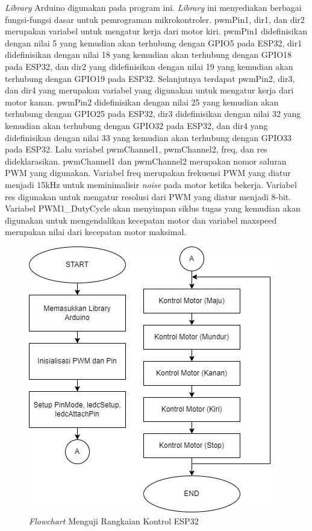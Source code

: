 \emph{Library} Arduino digunakan pada program ini. \emph{Library} ini menyediakan berbagai fungsi-fungsi dasar untuk pemrograman mikrokontroler. pwmPin1, dir1, dan dir2 merupakan variabel untuk mengatur kerja dari motor kiri. pwmPin1 didefinisikan dengan nilai 5 yang kemudian akan terhubung dengan GPIO5 pada ESP32, dir1 didefinisikan dengan nilai 18 yang kemudian akan terhubung dengan GPIO18 pada ESP32, dan dir2 yang didefinisikan dengan nilai 19 yang kemudian akan terhubung dengan GPIO19 pada ESP32. Selanjutnya terdapat pwmPin2, dir3, dan dir4 yang merupakan variabel yang digunakan untuk mengatur kerja dari motor kanan. pwmPin2 didefinisikan dengan nilai 25 yang kemudian akan terhubung dengan GPIO25 pada ESP32, dir3 didefinisikan dengan nilai 32 yang kemudian akan terhubung dengan GPIO32 pada ESP32, dan dir4 yang didefinisikan dengan nilai 33 yang kemudian akan terhubung dengan GPIO33 pada ESP32. Lalu variabel pwmChannel1, pwmChannel2, freq, dan res dideklarasikan. pwmChannel1 dan pwmChannel2 merupakan nomor saluran PWM yang digunakan. Variabel freq merupakan frekuensi PWM yang diatur menjadi 15kHz untuk meminimalisir \emph{noise} pada motor ketika bekerja. Variabel res digunakan untuk mengatur resolusi dari PWM yang diatur menjadi 8-bit. Variabel PWM1\_DutyCycle akan menyimpan siklus tugas yang kemudian akan digunakan untuk mengendalikan kecepatan motor dan variabel maxspeed merupakan nilai dari kecepatan motor maksimal.

\begin{figure} [ht] \centering
  \includegraphics[scale=0.7]{gambar/program/6. Uji Kontrol.png}
  \caption{\emph{Flowchart} Menguji Rangkaian Kontrol ESP32}
  \label{fig:Flowchart 6 Uji Kontrol}
\end{figure}

